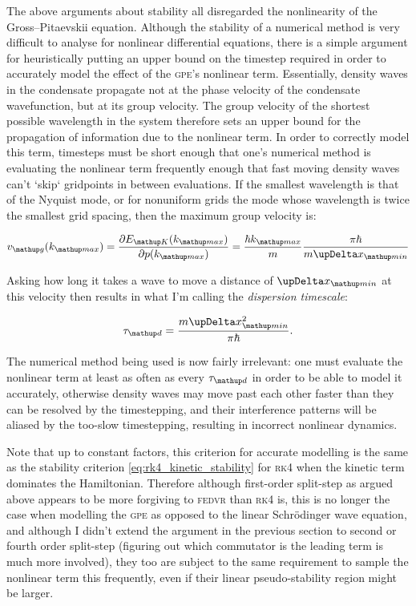 The above arguments about stability all disregarded the nonlinearity of the Gross--Pitaevskii equation. Although the stability of a numerical method is very difficult to analyse for nonlinear differential equations, there is a simple argument for heuristically putting an upper bound on the timestep required in order to accurately model the effect of the \textsc{gpe}'s nonlinear term. Essentially, density waves in the condensate propagate not at the phase velocity of the condensate wavefunction, but at its group velocity. The group velocity of the shortest possible wavelength in the system therefore sets an upper bound for the propagation of information due to the nonlinear term. In order to correctly model this term, timesteps must be short enough that one's numerical method is evaluating the nonlinear term frequently enough that fast moving density waves can't `skip` gridpoints in between evaluations. If the smallest wavelength is that of the Nyquist mode, or for nonuniform grids the mode whose wavelength is twice the smallest grid spacing, then the maximum group velocity is:

\begin{equation}
v_\up{g}(k_\up{max}) = \pdv{E_\up{K}(k_\up{max})}{p(k_\up{max})} =  \frac{\hbar k_\up{max}}{m}\frac{\pi \hbar}{m \upDelta x_\up{min}}
\end{equation}

Asking how long it takes a wave to move a distance of $\upDelta x_\up{min}$ at this velocity then results in what I'm calling the \emph{dispersion timescale}:

\begin{equation}
\tau_\up d = \frac{m\upDelta x_\up{min}^2 }{\pi \hbar}.
\end{equation} 

The numerical method being used is now fairly irrelevant: one must evaluate the nonlinear term at least as often as every $\tau_\up d$ in order to be able to model it accurately, otherwise density waves may move past each other faster than they can be resolved by the timestepping, and their interference patterns will be aliased by the too-slow timestepping, resulting in incorrect nonlinear dynamics.

Note that up to constant factors, this criterion for accurate modelling is the same as the stability criterion \eqref{eq:rk4_kinetic_stability} for \textsc{rk4} when the kinetic term dominates the Hamiltonian. Therefore although first-order split-step as argued above appears to be more forgiving to \textsc{fedvr} than \textsc{rk4} is, this is no longer the case when modelling the \textsc{gpe} as opposed to the linear Schr\"odinger wave equation, and although I didn't extend the argument in the previous section to second or fourth order split-step (figuring out which commutator is the leading term is much more involved), they too are subject to the same requirement to sample the nonlinear term this frequently, even if their linear pseudo-stability region might be larger.


